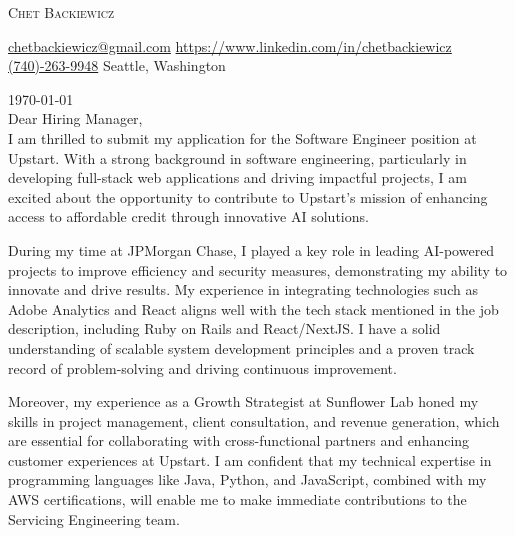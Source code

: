 \documentclass[12pt]{letter}
\begin{document}
 

\begin{center}
{\fontsize{28}{0}\selectfont\scshape Chet Backiewicz}

\fontsize{10}{12}\selectfont %
\href{mailto:chetbackiewicz@gmail.com}{\faEnvelope\enspace chetbackiewicz@gmail.com}\hfill
\href{https://www.linkedin.com/in/chetbackiewicz}{\faLinkedinIn\enspace https://www.linkedin.com/in/chetbackiewicz}\hfill
\href{tel:(740)-263-9948}{\faPhone\enspace (740)-263-9948}\hfill
\faMapMarker\enspace Seattle, Washington
\end{center}

\vspace{0.7in}

\today\\

\vspace{-0.1in}
Dear Hiring Manager,\\

\vspace{-0.1in}
\setlength\parindent{24pt}
\noindent I am thrilled to submit my application for the Software Engineer position at Upstart. With a strong background in software engineering, particularly in developing full-stack web applications and driving impactful projects, I am excited about the opportunity to contribute to Upstart's mission of enhancing access to affordable credit through innovative AI solutions.

During my time at JPMorgan Chase, I played a key role in leading AI-powered projects to improve efficiency and security measures, demonstrating my ability to innovate and drive results. My experience in integrating technologies such as Adobe Analytics and React aligns well with the tech stack mentioned in the job description, including Ruby on Rails and React/NextJS. I have a solid understanding of scalable system development principles and a proven track record of problem-solving and driving continuous improvement.

Moreover, my experience as a Growth Strategist at Sunflower Lab honed my skills in project management, client consultation, and revenue generation, which are essential for collaborating with cross-functional partners and enhancing customer experiences at Upstart. I am confident that my technical expertise in programming languages like Java, Python, and JavaScript, combined with my AWS certifications, will enable me to make immediate contributions to the Servicing Engineering team.
\end{document}
